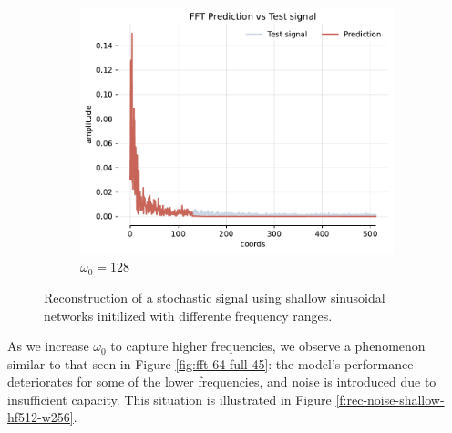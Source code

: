 \begin{figure}[h]
\begin{subfigure}[b]{0.32\textwidth}
        \centering
        \includegraphics[width=\textwidth]{img/ch4/fft-noise-h0-w128.pdf}
        \caption{$\omega_0=128$}
        \label{fig:fft-noise-shallow-w128}
    \end{subfigure}
    \caption{Reconstruction of a stochastic signal using shallow sinusoidal networks initilized with differente frequency ranges.}
    \label{f:rec-noise-shallow}
\end{figure}

As we increase $\omega_0$ to capture higher frequencies, we observe a phenomenon similar to that seen in Figure \ref{fig:fft-64-full-45}: the model's performance deteriorates for some of the lower frequencies, and noise is introduced due to insufficient capacity. This situation is illustrated in Figure \ref{f:rec-noise-shallow-hf512-w256}.


